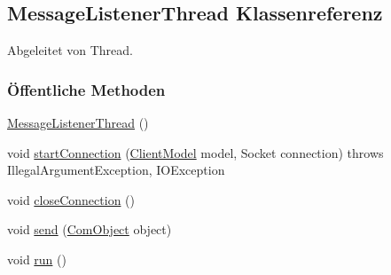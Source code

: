 \hypertarget{a00005}{\subsection{Message\-Listener\-Thread Klassenreferenz}
\label{a00005}
}


Abgeleitet von Thread.

\subsubsection*{Öffentliche Methoden}
\begin{DoxyCompactItemize}
\item 
\hypertarget{a00005_a90ebca0a8a2d843065708a4473f4428d}{\hyperlink{a00005_a90ebca0a8a2d843065708a4473f4428d}{Message\-Listener\-Thread} ()}\label{a00005_a90ebca0a8a2d843065708a4473f4428d}

\item 
void \hyperlink{a00005_a9b5e6f31c533ba11eada7bdd1767bf10}{start\-Connection} (\hyperlink{a00003}{Client\-Model} model, Socket connection)  throws Illegal\-Argument\-Exception, I\-O\-Exception 
\item 
\hypertarget{a00005_aaf912c696192e6a13eb70526891b4cd2}{void \hyperlink{a00005_aaf912c696192e6a13eb70526891b4cd2}{close\-Connection} ()}\label{a00005_aaf912c696192e6a13eb70526891b4cd2}

\item 
\hypertarget{a00005_afea035a8450d55661a10d4727154498d}{void \hyperlink{a00005_afea035a8450d55661a10d4727154498d}{send} (\hyperlink{a00037}{Com\-Object} object)}\label{a00005_afea035a8450d55661a10d4727154498d}

\item 
\hypertarget{a00005_a13a43e6d814de94978c515cb084873b1}{void \hyperlink{a00005_a13a43e6d814de94978c515cb084873b1}{run} ()}\label{a00005_a13a43e6d814de94978c515cb084873b1}

\end{DoxyCompactItemize}
